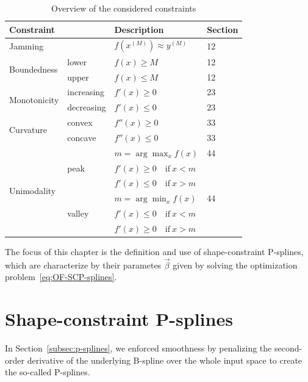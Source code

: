 \begin{table}[H]
	\centering
	\begin{tabular}{|l|ll|l|}
		\hline
		\textbf{Constraint}& & \textbf{Description}   & \textbf{Section}     \\ \hline \toprule
		Jamming            & & $f(x^{(M)}) \approx y^{(M)}$ &	12 \\ \hline 
		\multirow{2}{*}{Boundedness}  & lower & $f(x)\ge M$ 	  &	12 \\ \cline{2-4}
									  & upper & $f(x)\le M$    & 12 \\ \hline
		\multirow{2}{*}{Monotonicity} & increasing & $f'(x) \ge 0$ 	& 23 \\ \cline{2-4}
		& decreasing & $f'(x) \le 0$  & 23 \\ \hline	
		\multirow{2}{*}{Curvature}    & convex     & $f''(x)\ge 0$ 	& 33 \\ \cline{2-4}
		& concave    & $f''(x)\le 0$ 	& 33 \\ \hline
		\multirow{6}{*}{Unimodality}  & \multirow[t]{3}{*}{peak}  & $m = \arg \max_{x} f(x)$  & 44 \\ 
		&	                       & $f'(x) \ge 0 \quad \text{if} \ x < m$ & \\ 
		&  				       & $f'(x) \le 0 \quad \text{if} \ x > m$ & \\ \cline{2-4} 
		& \multirow[t]{3}{*}{valley}& $m = \arg \min_{x} f(x)$  & 44 \\ 
		&	                       & $f'(x) \le 0 \quad \text{if} \ x < m$ & \\ 
		&  				       & $f'(x) \ge 0 \quad \text{if} \ x > m$ &  \\ \hline		\bottomrule
	\end{tabular}
	\caption{Overview of the considered constraints}
	\label{tab:constraint_overview}
\end{table}

The focus of this chapter is the definition and use of shape-constraint P-splines, which are characterize by their parametes $\vec{\beta}$ given by solving the optimization problem~\ref{eq:OF-SCP-splines}.

\section{Shape-constraint P-splines}

In Section~\ref{subsec:p-splines}, we enforced smoothness by penalizing the second-order derivative of the underlying B-spline over the whole input space to create the so-called P-splines.  



